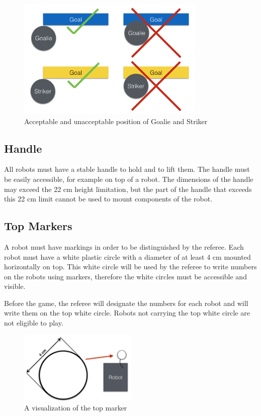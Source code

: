 \documentclass{article}
\begin{document}
\begin{figure}[H]
    \centering
    \includegraphics[width=0.8\textwidth]{media/image3.png}
    \caption{Acceptable and unacceptable position of Goalie and Striker}
    \label{fig:robot_in_goal}
\end{figure}

\subsection{ Handle \label{ref-024}}

All robots must have a stable handle to hold and to lift them. The handle must
be easily accessible, for example on top of a robot. The dimensions of the
handle may exceed the 22 cm height limitation, but the part of the handle that
exceeds this 22 cm limit cannot be used to mount components of the robot.

\subsection{ Top Markers\label{ref-025}}

A robot must have markings in order to be distinguished by the referee. Each
robot must have a white plastic circle with a diameter of at least 4 cm mounted
horizontally on top. This white circle will be used by the referee to write
numbers on the robots using markers, therefore the white circles must be
accessible and visible.

Before the game, the referee will designate the numbers for each robot and will
write them on the top white circle. Robots not carrying the top white circle
are not eligible to play.

\begin{figure}[H]
    \centering
    \includegraphics[width=0.5\textwidth]{media/image4.jpeg}
    \caption{A visualization of the top marker}
    \label{fig:top_marker}
\end{figure}
\end{document}
